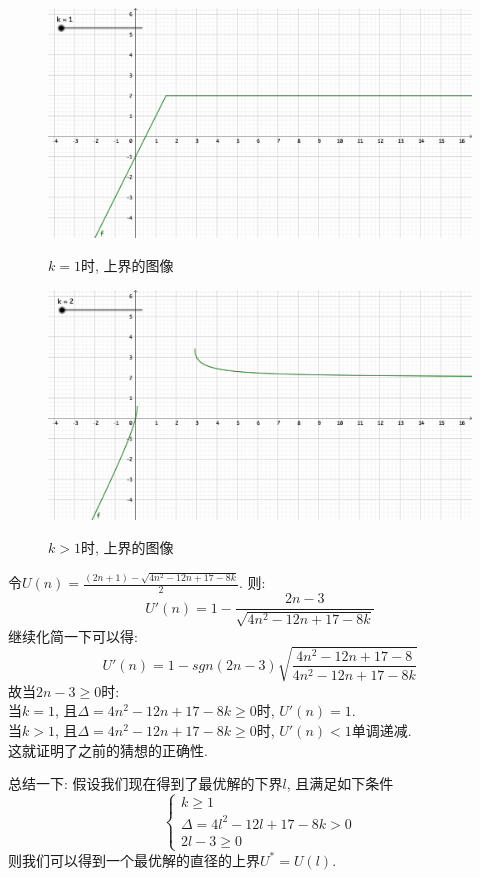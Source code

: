 \documentclass{article}
\begin{document}
\begin{figure}[h!]
	\begin{center}
		\includegraphics[width=12cm]{function-1.png} \\
		\caption{$k = 1$时, 上界的图像}
		\label{fig:2}
	\end{center}
\end{figure}

\begin{figure}[h!]
	\begin{center}
		\includegraphics[width=12cm]{function-g1.png} \\
		\caption{$k > 1$时, 上界的图像}
		\label{fig:3}
	\end{center}
\end{figure}

令$U(n) = \frac{(2n+1) - \sqrt{4n^2 - 12n + 17 - 8k}}{2}$.
则:
\[
	U'(n) = 1 - \frac{2n-3}{\sqrt{4n^2 - 12n + 17 - 8k}}
\]
继续化简一下可以得:
\[
	U'(n) = 1 - sgn(2n-3)\sqrt{\frac{4n^2 - 12n + 17 - 8}{4n^2 - 12n + 17 - 8k}}
\]
故当$2n-3 \geq 0$时:\\
当$k = 1$, 且$\Delta = 4n^2 - 12n + 17 - 8k \geq 0$时, $U'(n) = 1$.\\
当$k > 1$, 且$\Delta = 4n^2 - 12n + 17 - 8k \geq 0$时, $U'(n) < 1$单调递减. \\
这就证明了之前的猜想的正确性.

总结一下: 假设我们现在得到了最优解的下界$l$, 
且满足如下条件
\[
	\left\{
		\begin{array}{l}
			k \geq 1 \\
			\Delta = 4l^2 - 12l + 17 - 8k > 0\\
			2l - 3 \geq 0
		\end{array}
	\right.
\]
则我们可以得到一个最优解的直径的上界$U^* = U(l)$.
\end{document}
